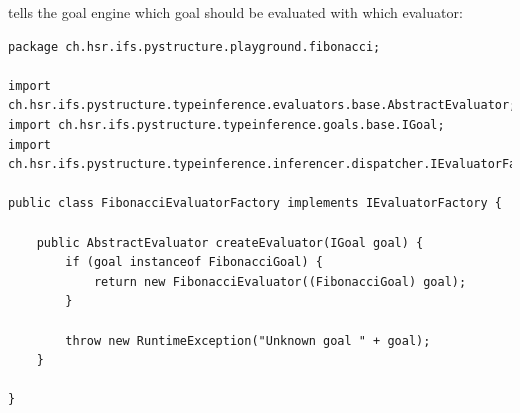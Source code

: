 \documentclass[12pt,halfparskip,DIV11,BCOR10mm]{scrreprt}
\begin{document}
 tells the goal engine which goal should be evaluated with which evaluator:

\begin{lstlisting}[style=smalljava]
package ch.hsr.ifs.pystructure.playground.fibonacci;

import ch.hsr.ifs.pystructure.typeinference.evaluators.base.AbstractEvaluator;
import ch.hsr.ifs.pystructure.typeinference.goals.base.IGoal;
import
ch.hsr.ifs.pystructure.typeinference.inferencer.dispatcher.IEvaluatorFactory;

public class FibonacciEvaluatorFactory implements IEvaluatorFactory {

	public AbstractEvaluator createEvaluator(IGoal goal) {
		if (goal instanceof FibonacciGoal) {
			return new FibonacciEvaluator((FibonacciGoal) goal);
		}
		
		throw new RuntimeException("Unknown goal " + goal);
	}

}
\end{lstlisting}

\listoffigures



\end{document}
